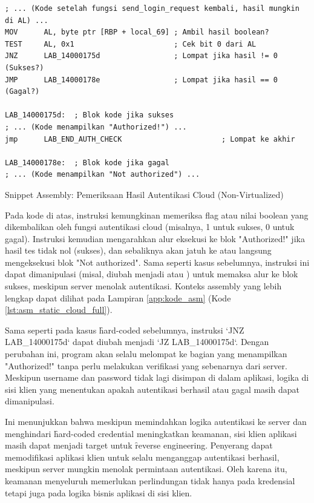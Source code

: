 \begin{listing}[H]
    \begin{verbatim}
; ... (Kode setelah fungsi send_login_request kembali, hasil mungkin di AL) ...
MOV      AL, byte ptr [RBP + local_69] ; Ambil hasil boolean?
TEST     AL, 0x1                       ; Cek bit 0 dari AL
JNZ      LAB_14000175d                 ; Lompat jika hasil != 0 (Sukses?)
JMP      LAB_14000178e                 ; Lompat jika hasil == 0 (Gagal?)

LAB_14000175d:  ; Blok kode jika sukses
; ... (Kode menampilkan "Authorized!") ...
jmp      LAB_END_AUTH_CHECK                       ; Lompat ke akhir

LAB_14000178e:  ; Blok kode jika gagal
; ... (Kode menampilkan "Not authorized") ...

\end{verbatim}
\caption{Snippet Assembly: Pemeriksaan Hasil Autentikasi Cloud (Non-Virtualized)}
\label{lst:asm_static_cloud_snippet}
\end{listing}

Pada kode di atas, instruksi  kemungkinan memeriksa flag atau nilai boolean yang dikembalikan oleh fungsi autentikasi cloud (misalnya, 1 untuk sukses, 0 untuk gagal). Instruksi  kemudian mengarahkan alur eksekusi ke blok "Authorized!" jika hasil tes tidak nol (sukses), dan sebaliknya akan jatuh ke  atau langsung mengeksekusi blok "Not authorized". Sama seperti kasus sebelumnya, instruksi  ini dapat dimanipulasi (misal, diubah menjadi  atau ) untuk memaksa alur ke blok sukses, meskipun server menolak autentikasi. Konteks assembly yang lebih lengkap dapat dilihat pada Lampiran \ref{app:kode_asm} (Kode \ref{lst:asm_static_cloud_full}).

Sama seperti pada kasus \f{hard-coded} sebelumnya, instruksi `JNZ LAB\_14000175d` dapat diubah menjadi `JZ LAB\_14000175d`. Dengan perubahan ini, program akan selalu melompat ke bagian yang menampilkan "Authorized!" tanpa perlu melakukan verifikasi yang sebenarnya dari server. Meskipun username dan password tidak lagi disimpan di dalam aplikasi, logika di sisi klien yang menentukan apakah autentikasi berhasil atau gagal masih dapat dimanipulasi.

Ini menunjukkan bahwa meskipun memindahkan logika autentikasi ke server dan menghindari \f{hard-coded credential} meningkatkan keamanan, sisi klien aplikasi masih dapat menjadi target untuk \f{reverse engineering}. Penyerang dapat memodifikasi aplikasi klien untuk selalu menganggap autentikasi berhasil, meskipun server mungkin menolak permintaan autentikasi. Oleh karena itu, keamanan menyeluruh memerlukan perlindungan tidak hanya pada kredensial tetapi juga pada logika bisnis aplikasi di sisi klien.

